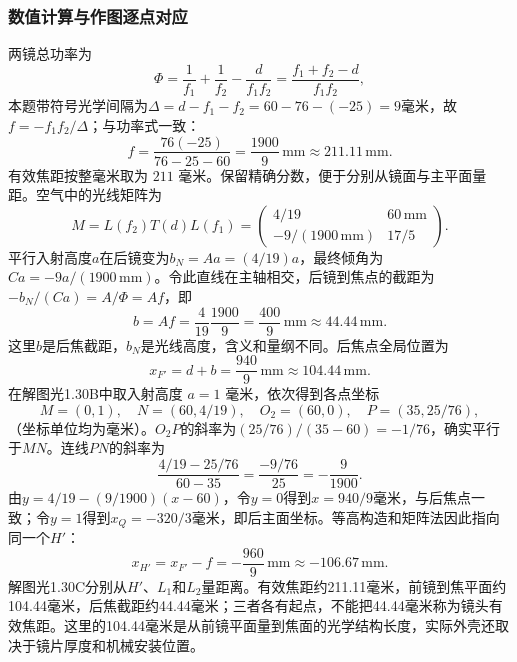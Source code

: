 \documentclass[UTF8,fontset=fandol,a4paper,11pt]{ctexart}
\newcommand{\figcaption}[1]{\par\vspace{2pt}{\small\color{muted}#1}\par}
\begin{document}
\subsubsection*{数值计算与作图逐点对应}
两镜总功率为
\[
\Phi=\frac1{f_1}+\frac1{f_2}-\frac d{f_1f_2}
=\frac{f_1+f_2-d}{f_1f_2},
\]
本题带符号光学间隔为$\Delta=d-f_1-f_2=60-76-(-25)=9$毫米，故$f=-f_1f_2/\Delta$；与功率式一致：
\[
\boxed{f=\frac{76(-25)}{76-25-60}
=\frac{1900}{9}\,\mathrm{mm}\approx211.11\,\mathrm{mm}}.
\]
有效焦距按整毫米取为 $211$ 毫米。保留精确分数，便于分别从镜面与主平面量距。空气中的光线矩阵为
\[
M=L(f_2)T(d)L(f_1)
=\begin{pmatrix}4/19&60\,\mathrm{mm}\\
-9/(1900\,\mathrm{mm})&17/5\end{pmatrix}.
\]
平行入射高度$a$在后镜变为$b_N=Aa=(4/19)a$，最终倾角为$Ca=-9a/(1900\,\mathrm{mm})$。令此直线在主轴相交，后镜到焦点的截距为$-b_N/(Ca)=A/\Phi=Af$，即
\[
b=Af=\frac4{19}\frac{1900}{9}
=\frac{400}{9}\,\mathrm{mm}\approx44.44\,\mathrm{mm}.
\]
这里$b$是后焦截距，$b_N$是光线高度，含义和量纲不同。后焦点全局位置为
\[
\boxed{x_{F'}=d+b=\frac{940}{9}\,\mathrm{mm}
\approx104.44\,\mathrm{mm}}.
\]
在解图光1.30B中取入射高度 $a=1$ 毫米，依次得到各点坐标
\[
M=(0,1),\quad N=(60,4/19),\quad
O_2=(60,0),\quad P=(35,25/76),
\]
（坐标单位均为毫米）。$O_2P$的斜率为$(25/76)/(35-60)=-1/76$，确实平行于$MN$。连线$PN$的斜率为
\[
\frac{4/19-25/76}{60-35}
=\frac{-9/76}{25}
=-\frac9{1900}.
\]
由$y=4/19-(9/1900)(x-60)$，令$y=0$得到$x=940/9$毫米，与后焦点一致；令$y=1$得到$x_Q=-320/3$毫米，即后主面坐标。等高构造和矩阵法因此指向同一个$H'$：
\[
\boxed{x_{H'}=x_{F'}-f
=-\frac{960}{9}\,\mathrm{mm}\approx-106.67\,\mathrm{mm}}.
\]
解图光1.30C分别从$H'$、$L_1$和$L_2$量距离。有效焦距约211.11毫米，前镜到焦平面约104.44毫米，后焦截距约44.44毫米；三者各有起点，不能把44.44毫米称为镜头有效焦距。这里的104.44毫米是从前镜平面量到焦面的光学结构长度，实际外壳还取决于镜片厚度和机械安装位置。
\begin{center}\begin{minipage}{.97\linewidth}\centering
{}
\figcaption{解图光1.30C\quad 有效焦距、前镜到焦面长度和后截距}
\end{minipage}\end{center}
\end{document}
